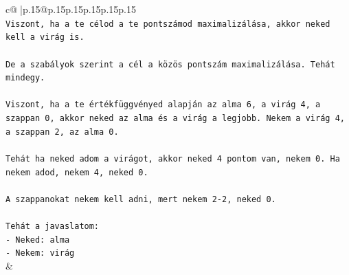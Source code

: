 \documentclass{article}
\begin{document}
{\begin{supertabular}{c@{$\;$}|p{.15\linewidth}@{}p{.15\linewidth}p{.15\linewidth}p{.15\linewidth}p{.15\linewidth}p{.15\linewidth}}
{{{\\ 
\texttt{Viszont, ha a te célod a te pontszámod maximalizálása, akkor neked kell a virág is.} \\
\\ 
\texttt{De a szabályok szerint a cél a közös pontszám maximalizálása. Tehát mindegy.} \\
\\ 
\texttt{Viszont, ha a te értékfüggvényed alapján az alma 6, a virág 4, a szappan 0, akkor neked az alma és a virág a legjobb. Nekem a virág 4, a szappan 2, az alma 0.} \\
\\ 
\texttt{Tehát ha neked adom a virágot, akkor neked 4 pontom van, nekem 0. Ha nekem adod, nekem 4, neked 0.} \\
\\ 
\texttt{A szappanokat nekem kell adni, mert nekem 2{-}2, neked 0.} \\
\\ 
\texttt{Tehát a javaslatom:} \\
\texttt{{-} Neked: alma} \\
\texttt{{-} Nekem: virág} \\
            }
        }
    }
    & \\ \\


\end{supertabular}}
\end{document}
